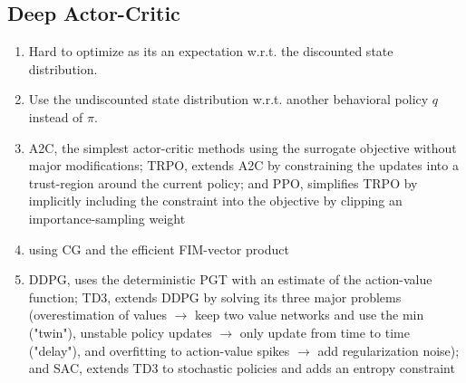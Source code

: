		\subsection{Deep Actor-Critic}
			\begin{enumerate}
				\item Hard to optimize as its an expectation w.r.t. the discounted state distribution.
				\item Use the undiscounted state distribution w.r.t. another behavioral policy \(q\) instead of \(\pi\).
				\item \ac{A2C}, the simplest actor-critic methods using the surrogate objective without major modifications; \ac{TRPO}, extends \ac{A2C} by constraining the updates into a trust-region around the current policy; and \ac{PPO}, simplifies \ac{TRPO} by implicitly including the constraint into the objective by clipping an importance-sampling weight
				\item using \ac{CG} and the efficient \ac{FIM}-vector product
				\item \ac{DDPG}, uses the deterministic \ac{PGT} with an estimate of the action-value function; \ac{TD3}, extends \ac{DDPG} by solving its three major problems (overestimation of values \(\to\) keep two value networks and use the min ("twin"), unstable policy updates \(\to\) only update from time to time ("delay"), and overfitting to action-value spikes \(\to\) add regularization noise); and \ac{SAC}, extends \ac{TD3} to stochastic policies and adds an entropy constraint
			\end{enumerate}

